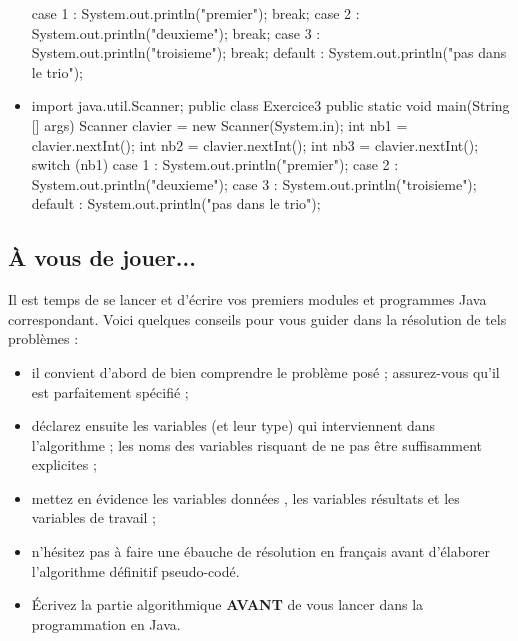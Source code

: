 \documentclass[11pt,a4paper]{article}
\begin{document}
\begin{itemize}
\begin{Java}
{{{          case 1 : System.out.println("premier"); break;
          case 2 : System.out.println("deuxieme"); break;
          case 3 : System.out.println("troisieme"); break;
          default : System.out.println("pas dans le trio");
        } 
    }
}
        \end{Java} \textcolor{gray}{\underline{\hspace*{10em}}} 
			\item \begin{Java}
import java.util.Scanner;
public class Exercice3 {
    public static void main(String [] args) {
        Scanner clavier = new Scanner(System.in);
        int nb1 = clavier.nextInt();
        int nb2 = clavier.nextInt();
        int nb3 = clavier.nextInt();
        switch (nb1){
          case 1 : System.out.println("premier");
          case 2 : System.out.println("deuxieme");
          case 3 : System.out.println("troisieme");
          default : System.out.println("pas dans le trio");
        } 
    }
}
        \end{Java} \textcolor{gray}{\underline{\hspace*{20em}}} 
					\end{itemize}
				
            \par
        \subsection{\`A vous de jouer...}
          Il est temps de se lancer et d'\'ecrire vos premiers modules et programmes Java correspondant. 
          Voici quelques conseils pour vous guider dans la r\'esolution de tels probl\`emes :
          
					\begin{itemize}
				
			\item il convient d'abord de bien comprendre le probl\`eme pos\'e ; assurez-vous qu'il est parfaitement sp\'ecifi\'e ;
			\item d\'eclarez ensuite les variables (et leur type) qui interviennent dans l'algorithme ; les noms des variables risquant de ne pas \^etre suffisamment explicites ;
			\item mettez en \'evidence les variables \guillemotleft  donn\'ees \guillemotright , les variables \guillemotleft  r\'esultats \guillemotright  et les variables de travail ;
			\item n'h\'esitez pas \`a faire une \'ebauche de r\'esolution en fran\c cais avant d'\'elaborer l'algorithme d\'efinitif pseudo-cod\'e.
			\item \'Ecrivez la partie algorithmique \textbf{AVANT} de vous lancer dans la programmation en Java.
					\end{itemize}
				
\end{document}
